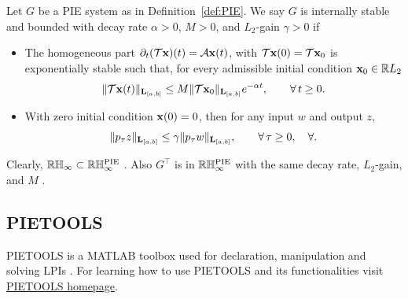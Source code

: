 \begin{definition}\label{def:RHinf}
	Let $G$ be a PIE system as in Definition~\ref{def:PIE}. We say $G$ is internally stable and bounded with decay rate
	$\alpha>0$, $M>0$, and $L_2$-gain $\gamma>0$ if
	\begin{itemize}
		\item The homogeneous part \(\partial_t(\mathcal{T}\mathbf{x})(t)=\mathcal{A}\mathbf{x}(t)\), with \(\mathcal{T}\mathbf{x}(0)=\mathcal{T}\mathbf{x}_0\)
		      is exponentially stable such that, for every admissible initial condition
		      $\mathbf{x}_0 \in \mathbb{R} L_2$
		      \[
			      \|\mathcal{T}\mathbf{x}(t)\|_{\mathbf{L}_{[a,b]}}
			      \leq
			      M\|\mathcal{T}\mathbf{x}_0\|_{\mathbf{L}_{[a,b]}}e^{-\alpha t},
			      \qquad \forall\,t\geq0.
		      \]
		\item With zero initial condition $\mathbf{x}(0)=0$, then for
		      any input $w$ and output $z$,
		      \[
			      \|p_\tau z\|_{\mathbf{L}_{[a,b]}}
			      \leq
			      \gamma\|p_\tau w\|_{\mathbf{L}_{[a,b]}},
			      \qquad
			      \forall\,\tau\geq0,\quad
			      \forall.
		      \]
	\end{itemize}
	Clearly, $\mathbb{R}\mathbb{H}_\infty\subset\mathbb{R}\mathbb{H}_\infty^{\mathrm{PIE}}$ \cite{TsaiGu2014RobustOptimalControl}. 
	Also $G^\top$ is in $\mathbb{R}\mathbb{H}_\infty^{\mathrm{PIE}}$ with the same decay rate, $L_2$-gain, and $M$ \cite{shivaknew}.
\end{definition}

\subsection{PIETOOLS}
PIETOOLS is a MATLAB toolbox used for declaration, manipulation and solving LPIs \cite{9147712}. For learning how to use PIETOOLS and its functionalities visit \href{https://control.asu.edu/pietools/pietools}{PIETOOLS homepage}.

